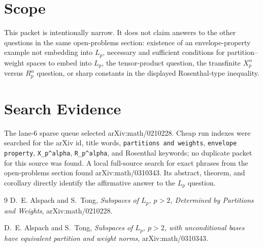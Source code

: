 \documentclass[11pt]{article}
\begin{document}
\section*{Scope}

This packet is intentionally narrow.  It does not claim answers to the other
questions in the same open-problems section: existence of an envelope-property
example not embedding into \(L_p\), necessary and sufficient conditions for
partition--weight spaces to embed into \(L_p\), the tensor-product question,
the transfinite \(X_p^\alpha\) versus \(R_p^\alpha\) question, or sharp
constants in the displayed Rosenthal-type inequality.

\section*{Search Evidence}

The lane-6 sparse queue selected arXiv:math/0210228.  Cheap run indexes were
searched for the arXiv id, title words, \texttt{partitions and weights},
\texttt{envelope property}, \texttt{X\_p\^{}alpha}, \texttt{R\_p\^{}alpha},
and Rosenthal keywords; no duplicate packet for this source was found.  A
local full-source search for exact phrases from the open-problems section
found arXiv:math/0310343.  Its abstract, theorem, and corollary directly
identify the affirmative answer to the \(L_p\) question.

\begin{thebibliography}{9}
D.~E. Alspach and S.~Tong,
\emph{Subspaces of \(L_p\), \(p>2\), Determined by Partitions and Weights},
arXiv:math/0210228.

D.~E. Alspach and S.~Tong,
\emph{Subspaces of \(L_p\), \(p>2\), with unconditional bases have equivalent
partition and weight norms},
arXiv:math/0310343.
\end{thebibliography}
\end{document}
